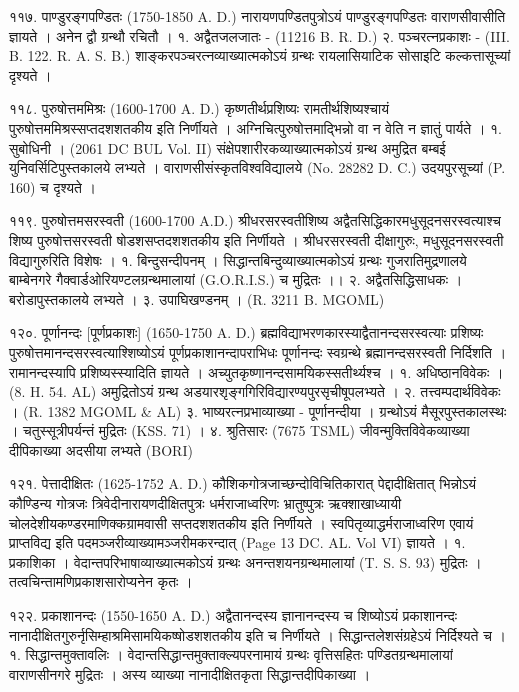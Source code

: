 ११७. पाण्डुरङ्गपण्डितः (1750-1850 A. D.)
नारायणपण्डितपुत्रोऽयं पाण्डुरङ्गपण्डितः वाराणसीवासीति ज्ञायते । अनेन द्वौ ग्रन्थौ रचितौ ।
१. अद्वैतजलजातः - (11216 B. R. D.)
२. पञ्चरत्नप्रकाशः - (III. B. 122. R. A. S. B.) शाङ्करपञ्चरत्नव्याख्यात्मकोऽयं ग्रन्थः रायलासियाटिक सोसाइटि कल्कत्तासूच्यां दृश्यते ।

११८. पुरुषोत्तममिश्रः (1600-1700 A. D.)
कृष्णतीर्थप्रशिष्यः रामतीर्थशिष्यश्चायं पुरुषोत्तममिश्रस्सप्तदशशतकीय इति निर्णीयते । अग्निचित्पुरुषोत्तमाद्भिन्नो वा न वेति न ज्ञातुं पार्यते ।
१. सुबोधिनी । (2061 DC BUL Vol. II) संक्षेपशारीरकव्याख्यात्मकोऽयं ग्रन्थ अमुद्रित बम्बई युनिवर्सिटिपुस्तकालये लभ्यते । वाराणसीसंस्कृतविश्वविद्यालये (No. 28282 D. C.) उदयपुरसूच्यां (P. 160) च दृश्यते ।

११९. पुरुषोत्तमसरस्वती (1600-1700 A.D.)
श्रीधरसरस्वतीशिष्य अद्वैतसिद्धिकारमधुसूदनसरस्वत्याश्च शिष्य पुरुषोत्तसरस्वती षोडशसप्तदशशतकीय इति निर्णीयते । श्रीधरसरस्वती दीक्षागुरुः, मधुसूदनसरस्वती विद्यागुरुरिति विशेषः ।
१. बिन्दुसन्दीपनम् । सिद्धान्तबिन्दुव्याख्यात्मकोऽयं ग्रन्थः गुजरातिमुद्रणालये बाम्बेनगरे गैक्वार्डओरियण्टलग्रन्थमालायां (G.O.R.I.S.) च मुद्रितः ।।
२. अद्वैतसिद्धिसाधकः । बरोडापुस्तकालये लभ्यते ।
३. उपाघिखण्डनम् । (R. 3211 B. MGOML)

१२०. पूर्णानन्दः [पूर्णप्रकाशः] (1650-1750 A. D.)
ब्रह्मविद्याभरणकारस्याद्वैतानन्दसरस्वत्याः प्रशिष्यः पुरुषोत्तमानन्दसरस्वत्याश्शिष्योऽयं पूर्णप्रकाशानन्दापराभिधः पूर्णानन्दः स्वग्रन्थे ब्रह्मानन्दसरस्वती निर्दिशति । रामानन्दस्यापि प्रशिष्यस्स्यादिति ज्ञायते । अच्युतकृष्णानन्दसामयिकस्सतीर्थ्यश्च ।
१. अधिष्ठानविवेकः । (8. H. 54. AL) अमुद्रितोऽयं ग्रन्थ अडयारशृङ्गगिरिविद्यारण्यपुरसृचीषूपलभ्यते ।
२. तत्त्वम्पदार्थविवेकः । (R. 1382 MGOML & AL)
३. भाष्यरत्नप्रभाव्याख्या - पूर्णानन्दीया । ग्रन्थोऽयं मैसूरपुस्तकालस्थः । चतुस्सूत्रीपर्यन्तं मुद्रितः (KSS. 71) ।
४. श्रुतिसारः (7675 TSML) जीवन्मुक्तिविवेकव्याख्या दीपिकाख्या अदसीया लभ्यते (BORI)

१२१. पेत्तादीक्षितः (1625-1752 A. D.)
कौशिकगोत्रजाच्छन्दोविचितिकारात् पेद्दादीक्षितात् भिन्नोऽयं कौण्डिन्य गोत्रजः त्रिवेदीनारायणदीक्षितपुत्रः धर्मराजाध्वरिणः भ्रातुष्पुत्रः ऋक्शाखाध्यायी चोलदेशीयकण्डरमाणिक्कग्रामवासी सप्तदशशतकीय इति निर्णीयते । स्वपितृव्याद्धर्मराजाध्वरिण एवायं प्राप्तविद्य इति पदमञ्जरीव्याख्यामञ्जरीमकरन्दात् (Page 13 DC. AL. Vol VI) ज्ञायते ।
१. प्रकाशिका । वेदान्तपरिभाषाव्याख्यात्मकोऽयं ग्रन्थः अनन्तशयनग्रन्थमालायां (T. S. S. 93) मुद्रितः । तत्वचिन्तामणिप्रकाशसारोप्यनेन कृतः ।

१२२. प्रकाशानन्दः (1550-1650 A. D.)
अद्वैतानन्दस्य ज्ञानानन्दस्य च शिष्योऽयं प्रकाशानन्दः नानादीक्षितगुरुर्नृसिम्हाश्रमिसामयिकष्षोडशशतकीय इति च निर्णीयते । सिद्धान्तलेशसंग्रहेऽयं निर्दिश्यते च ।
१. सिद्धान्तमुक्तावलिः । वेदान्तसिद्धान्तमुक्ताक्ल्यपरनामायं ग्रन्थः वृत्तिसहितः पण्डितग्रन्थमालायां वाराणसीनगरे मुद्रितः । अस्य व्याख्या नानादीक्षितकृता सिद्धान्तदीपिकाख्या ।

